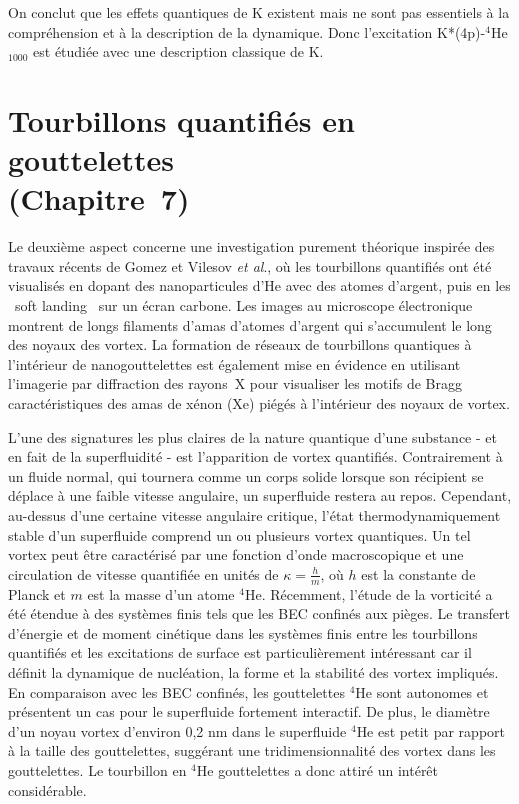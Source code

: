 		On conclut que les effets quantiques de K existent mais ne sont pas essentiels à la compréhension et à la description de la dynamique. Donc l'excitation K*(4p)-$^4$He$_{1000}$ est étudiée avec une description classique de K.

	\section*{Tourbillons quantifiés en gouttelettes\\\small(Chapitre~7)}
		Le deuxième aspect concerne une investigation purement théorique inspirée des travaux récents de Gomez et Vilesov \emph{et al}., où les tourbillons quantifiés ont été visualisés en dopant des nanoparticules d'He avec des atomes d'argent, puis en les \guillemotleft~soft landing~\guillemotright{} sur un écran carbone. Les images au microscope électronique montrent de longs filaments d'amas d'atomes d'argent qui s'accumulent le long des noyaux des vortex. La formation de réseaux de tourbillons quantiques à l'intérieur de nanogouttelettes est également mise en évidence en utilisant l'imagerie par diffraction des rayons~X pour visualiser les motifs de Bragg caractéristiques des amas de xénon (Xe) piégés à l'intérieur des noyaux de vortex.
		
		L'une des signatures les plus claires de la nature quantique d'une substance - et en fait de la superfluidité - est l'apparition de vortex quantifiés. Contrairement à un fluide normal, qui tournera comme un corps solide lorsque son récipient se déplace à une faible vitesse angulaire, un superfluide restera au repos. Cependant, au-dessus d'une certaine vitesse angulaire critique, l'état thermodynamiquement stable d'un superfluide comprend un ou plusieurs vortex quantiques. Un tel vortex peut être caractérisé par une fonction d'onde macroscopique et une circulation de vitesse quantifiée en unités de $\kappa=\frac{h}{m}$, où $h$ est la constante de Planck et $m$ est la masse d'un atome $^4$He\citep{Don91,Pit03}. Récemment, l'étude de la vorticité a été étendue à des systèmes finis tels que les BEC confinés aux pièges\citep{Pit03,Fetter2009}. Le transfert d'énergie et de moment cinétique dans les systèmes finis entre les tourbillons quantifiés et les excitations de surface est particulièrement intéressant car il définit la dynamique de nucléation, la forme et la stabilité des vortex impliqués\citep{Pit03,Fetter2009}. En comparaison avec les BEC confinés, les gouttelettes $^4$He sont autonomes et présentent un cas pour le superfluide fortement interactif. De plus, le diamètre d'un noyau vortex d'environ 0,2 nm dans le superfluide $^4$He\citep{Don91} est petit par rapport à la taille des gouttelettes, suggérant une tridimensionnalité des vortex dans les gouttelettes. Le tourbillon en $^4$He gouttelettes a donc attiré un intérêt considérable\citep{Clo98,Lehmann2003,Bar06,Sti06}.
		
